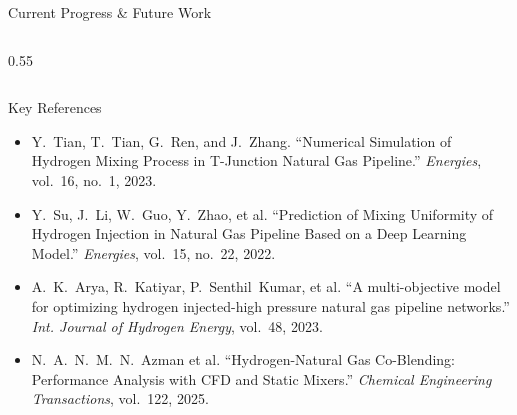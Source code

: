 \documentclass[10pt, aspectratio=169]{beamer}
\begin{document}
\begin{frame}{Current Progress \& Future Work}
\begin{columns}[T]
\begin{column}{0.55\textwidth}
{%
            }
        \end{column}    
    \end{columns}
\end{frame}

\begin{frame}{Key References}
    \small
    \begin{itemize}
        \item Y.~Tian, T.~Tian, G.~Ren, and J.~Zhang.
        ``Numerical Simulation of Hydrogen Mixing Process in T-Junction Natural Gas Pipeline.''
        \textit{Energies}, vol.~16, no.~1, 2023.

        \vspace{0.8em}
        \item Y.~Su, J.~Li, W.~Guo, Y.~Zhao, et al.
        ``Prediction of Mixing Uniformity of Hydrogen Injection in Natural Gas Pipeline Based on a Deep Learning Model.''
        \textit{Energies}, vol.~15, no.~22, 2022.

        \vspace{0.8em}
        \item A.~K.~Arya, R.~Katiyar, P.~Senthil~Kumar, et al.
        ``A multi-objective model for optimizing hydrogen injected-high pressure natural gas pipeline networks.''
        \textit{Int. Journal of Hydrogen Energy}, vol.~48, 2023.

        \vspace{0.8em}
        \item N.~A.~N.~M.~N.~Azman et al.
        ``Hydrogen-Natural Gas Co-Blending: Performance Analysis with CFD and Static Mixers.''
        \textit{Chemical Engineering Transactions}, vol.~122, 2025.
    \end{itemize}
\end{frame}
\end{document}
